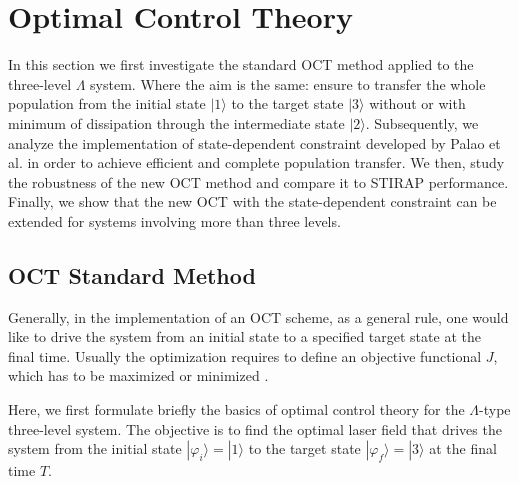 \documentclass[]{interact}
\theoremstyle{plain}%
\theoremstyle{definition}
\theoremstyle{remark}
\begin{document}
\section{Optimal Control Theory}
In this section we first investigate the standard OCT method applied to the 
three-level $\Lambda$ system. Where the aim is the same: ensure to transfer the 
whole  population from the initial state $|1\rangle$ to the target state 
$|3\rangle$ without or with minimum of dissipation through the intermediate 
state $|2\rangle$. 
Subsequently, we analyze the implementation of state-dependent constraint 
developed by Palao et al. \cite{Koch}  in order to achieve efficient and 
complete 
population transfer. We then, study the robustness of the new OCT
method and compare it to STIRAP performance. Finally, we show that the new OCT 
with the state-dependent constraint 
can be extended for systems involving more than three levels.
\subsection{OCT Standard Method}
Generally, in the implementation of an OCT scheme, as a general rule, one 
would like to drive the system from an initial state to a specified target 
state 
at the final time. Usually the optimization 
requires to define an objective functional $J$, which  has to be 
maximized or minimized \cite{Rabitz,Vivie}. 

Here, we first formulate briefly the basics of optimal control theory for 
the $\Lambda$-type three-level system. The objective is to find the optimal 
laser field that drives the system from the initial state 
$|\varphi_i\rangle=|1\rangle$ to the target state $|\varphi_f\rangle=|3\rangle$ 
at the final time $T$. 
\end{document}

